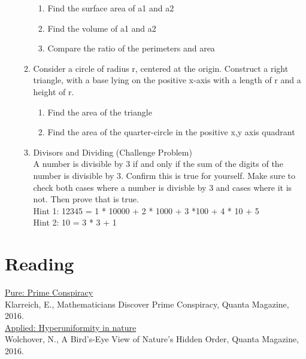 \documentclass{article}
\begin{document}
\begin{enumerate}
\begin{enumerate}
\begin{enumerate}
            \item Find the surface area of a1 and a2
            \item Find the volume of a1 and a2
            \item Compare the ratio of the perimeters and area
        \end{enumerate}
        \item Consider a circle of radius r, centered at the origin. Construct a right triangle, with a base lying on the positive x-axis with a length of r and a height of r. 
        \begin{enumerate}
            \item Find the area of the triangle
            \item Find the area of the quarter-circle in the positive x,y axis quadrant
        \end{enumerate}
     
     \item Divisors and Dividing (Challenge Problem)\\
     A number is divisible by 3 if and only if the sum of the digits of the number is divisible by 3. Confirm this is true for yourself. Make sure to check both cases where a number is divisble by 3 and cases where it is not. Then prove that is true.\\
     Hint 1: 12345 = 1 * 10000 + 2 * 1000 + 3 *100 + 4 * 10 + 5\\
     Hint 2: 10 = 3 * 3 + 1
        

    \end{enumerate}
\end{enumerate}


\section{Reading}

\href{https://www.quantamagazine.org/mathematicians-discover-prime-conspiracy-20160313/}{Pure: Prime Conspiracy}\\
Klarreich, E., Mathematicians Discover Prime Conspiracy, Quanta Magazine, 2016.\\

\href{https://www.quantamagazine.org/hyperuniformity-found-in-birds-math-and-physics-20160712/}{Applied: Hyperuniformity in nature}\\
Wolchover, N., A Bird’s-Eye View of Nature’s Hidden Order, Quanta Magazine, 2016.\\
\end{document}
